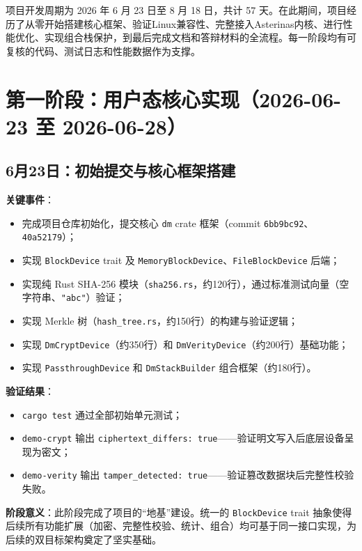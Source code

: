 项目开发周期为 2026 年 6 月 23 日至 8 月 18 日，共计 57 天。在此期间，项目经历了从零开始搭建核心框架、验证Linux兼容性、完整接入Asterinas内核、进行性能优化、实现组合栈保护，到最后完成文档和答辩材料的全流程。每一阶段均有可复核的代码、测试日志和性能数据作为支撑。

\section{第一阶段：用户态核心实现（2026-06-23 至 2026-06-28）}

\subsection{6月23日：初始提交与核心框架搭建}

\textbf{关键事件}：
\begin{itemize}
    \item 完成项目仓库初始化，提交核心 \texttt{dm} crate 框架（commit \texttt{6bb9bc92}、\texttt{40a52179}）；
    \item 实现 \texttt{BlockDevice} trait 及 \texttt{MemoryBlockDevice}、\texttt{FileBlockDevice} 后端；
    \item 实现纯 Rust SHA-256 模块（\texttt{sha256.rs}，约120行），通过标准测试向量（空字符串、\texttt{"abc"}）验证；
    \item 实现 Merkle 树（\texttt{hash\_tree.rs}，约150行）的构建与验证逻辑；
    \item 实现 \texttt{DmCryptDevice}（约350行）和 \texttt{DmVerityDevice}（约200行）基础功能；
    \item 实现 \texttt{PassthroughDevice} 和 \texttt{DmStackBuilder} 组合框架（约180行）。
\end{itemize}

\textbf{验证结果}：
\begin{itemize}
    \item \texttt{cargo test} 通过全部初始单元测试；
    \item \texttt{demo-crypt} 输出 \texttt{ciphertext\_differs: true}——验证明文写入后底层设备呈现为密文；
    \item \texttt{demo-verity} 输出 \texttt{tamper\_detected: true}——验证篡改数据块后完整性校验失败。
\end{itemize}

\textbf{阶段意义}：此阶段完成了项目的“地基”建设。统一的 \texttt{BlockDevice} trait 抽象使得后续所有功能扩展（加密、完整性校验、统计、组合）均可基于同一接口实现，为后续的双目标架构奠定了坚实基础。


